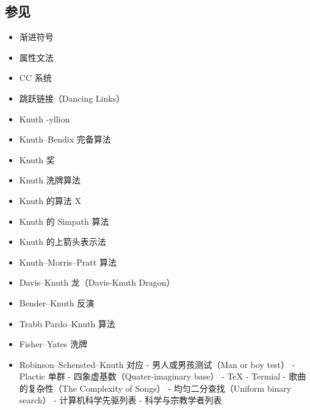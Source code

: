 \subsection{参见}
\begin{itemize}
\item 渐进符号
\item 属性文法
\item CC 系统
\item 跳跃链接（Dancing Links）
\item Knuth -yllion
\item Knuth–Bendix 完备算法
\item Knuth 奖
\item Knuth 洗牌算法
\item Knuth 的算法 X
\item Knuth 的 Simpath 算法
\item Knuth 的上箭头表示法
\item Knuth–Morris–Pratt 算法
\item Davis–Knuth 龙（Davis-Knuth Dragon）
\item Bender–Knuth 反演
\item Trabb Pardo–Knuth 算法
\item Fisher–Yates 洗牌
\item Robinson–Schensted–Knuth 对应
- 男人或男孩测试（Man or boy test）
- Plactic 单群
- 四象虚基数（Quater-imaginary base）
- TeX
- Termial
- 歌曲的复杂性（The Complexity of Songs）
- 均匀二分查找（Uniform binary search）
- 计算机科学先驱列表
- 科学与宗教学者列表
\end{itemize}